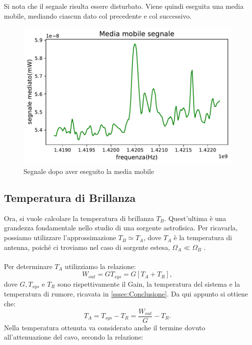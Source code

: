 Si nota che il segnale risulta essere disturbato. Viene quindi eseguita una media mobile, mediando ciascun dato col precedente e col successivo.

\begin{figure}[H]
	\centering
	\includegraphics[scale=0.8]{Media_mobile_segnale.pdf}
	\caption{Segnale dopo aver eseguito la media mobile}
    	\label{fig:Media_mobile_segnale}
\end{figure}


\subsection{Temperatura di Brillanza}

Ora, si vuole calcolare la temperatura di brillanza $T_{B}$. Quest'ultima è una grandezza fondamentale nello studio di una sorgente astrofisica. Per ricavarla, possiamo utilizzare l'approssimazione $T_{B} \simeq T_{A}$, dove $T_{A}$ è la temperatura di antenna, poiché ci troviamo nel caso di sorgente estesa, $\Omega_{A} \ll \Omega_{B}$ \cite{Osservabili}.
\\\\
Per determinare $T_{A}$ utilizziamo la relazione:
\begin{equation}
    W_{out}=GT_{sys}=G[T_{A}+T_{R}],
\end{equation}
dove $G, T_{sys}$ e $T_{R}$ sono rispettivamente il Gain, la temperatura del sistema e la temperatura di rumore, ricavata in \ref{sssec:Conclusione}.
Da qui appunto si ottiene che:
\begin{equation}
    T_{A}=T_{sys}-T_{R}=\frac{W_{out}}{G}-T_{R}. 
\label{temp antenna}
\end{equation}
Nella temperatura ottenuta va considerato anche il termine dovuto all'attenuazione del cavo, secondo la relazione:

